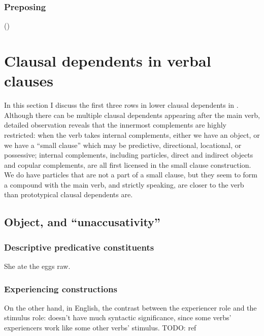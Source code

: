 \documentclass[UTF8, a4paper, oneside, scheme=plain, 12pt]{ctexbook}
\begin{document}
\subsubsection{Preposing}\label{sec:simple-clause.derivation.preposing}

()


\section{Clausal dependents in verbal clauses}

In this section I discuss the first three rows in 
lower clausal dependents in .
Although there can be multiple clausal dependents appearing after the main verb, 
detailed observation reveals that the innermost complements are highly restricted: 
when the verb takes internal complements,
either we have an object, or we have a ``small clause'' 
which may be predictive, directional, locational, or possessive; 
internal complements, including particles, direct and indirect objects and copular complements, 
are all first licensed in the small clause construction.
We do have particles that are not a part of a small clause, 
but they seem to form a compound with the main verb,
and strictly speaking, are closer to the verb than 
prototypical clausal dependents are.

\subsection{Object, and ``unaccusativity''}

\subsubsection{Descriptive predicative constituents}

\begin{exe}
    \ex She ate the eggs raw. 
\end{exe}

\subsubsection{Experiencing constructions}

On the other hand, 
in English, the contrast between the experiencer role and the stimulus role:
doesn't have much syntactic significance,
since some verbs' experiencers work like some other verbs' stimulus. TODO: ref
\end{document}
